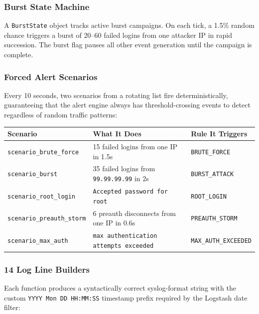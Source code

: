 \documentclass[12pt,a4paper]{article}
\begin{document}
\subsubsection*{Burst State Machine}
A \texttt{BurstState} object tracks active burst campaigns. On each tick,
a 1.5\% random chance triggers a burst of 20--60 failed logins from one
attacker IP in rapid succession. The burst flag pauses all other event
generation until the campaign is complete.

\subsubsection*{Forced Alert Scenarios}
Every 10 seconds, two scenarios from a rotating list fire deterministically,
guaranteeing that the alert engine always has threshold-crossing events to
detect regardless of random traffic patterns:

\begin{center}
\begin{tabular}{p{4cm}p{5cm}p{4.5cm}}
  \toprule
  \textbf{Scenario} & \textbf{What It Does} & \textbf{Rule It Triggers} \\
  \midrule
  \texttt{scenario\_brute\_force}  & 15 failed logins from one IP in 1.5s   & \texttt{BRUTE\_FORCE} \\
  \texttt{scenario\_burst}         & 35 failed logins from \texttt{99.99.99.99} in 2s & \texttt{BURST\_ATTACK} \\
  \texttt{scenario\_root\_login}   & \texttt{Accepted password for root}      & \texttt{ROOT\_LOGIN} \\
  \texttt{scenario\_preauth\_storm}& 6 preauth disconnects from one IP in 0.6s & \texttt{PREAUTH\_STORM} \\
  \texttt{scenario\_max\_auth}     & \texttt{max authentication attempts exceeded} & \texttt{MAX\_AUTH\_EXCEEDED} \\
  \bottomrule
\end{tabular}
\end{center}

\subsubsection*{14 Log Line Builders}
Each function produces a syntactically correct syslog-format string with
the custom \texttt{YYYY Mon DD HH:MM:SS} timestamp prefix required by the
Logstash date filter:
\end{document}
